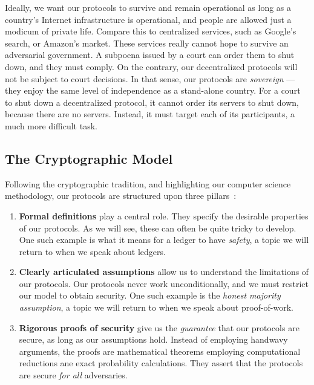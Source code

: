 Ideally, we want our protocols to survive and remain operational as long as a country's Internet
infrastructure is operational, and people are allowed just a modicum of private life. Compare this
to centralized services, such as Google's search, or Amazon's market. These services really cannot
hope to survive an adversarial government. A subpoena issued by a court can order them to shut
down, and they must comply. On the contrary, our decentralized protocols will not be subject to
court decisions. In that sense, our protocols are \emph{sovereign} --- they enjoy the same level
of independence as a stand-alone country. For a court to shut down a decentralized protocol, it
cannot order its servers to shut down, because there are no servers. Instead, it must target
each of its participants, a much more difficult task.

\subsection*{The Cryptographic Model}

Following the cryptographic tradition, and highlighting our computer science methodology,
our protocols are structured upon three pillars~\cite{katz}:

\begin{enumerate}
  \item \textbf{Formal definitions} play a central role. They specify the
        desirable properties of our protocols. As we will see, these can often
        be quite tricky to develop. One such example is what it means for a
        ledger to have \emph{safety}, a topic we will return to when we speak
        about ledgers.
  \item \textbf{Clearly articulated assumptions} allow us to understand the
        limitations of our protocols. Our protocols never work
        unconditionally, and we must restrict our model to obtain security. One
        such example is the \emph{honest majority assumption}, a topic we will
        return to when we speak about proof-of-work.
  \item \textbf{Rigorous proofs of security} give us the \emph{guarantee} that
        our protocols are secure, as long as our assumptions hold. Instead of
        employing handwavy arguments, the proofs are mathematical theorems
        employing computational reductions ane exact probability calculations.
        They assert that the protocols are secure \emph{for all} adversaries.
\end{enumerate}

